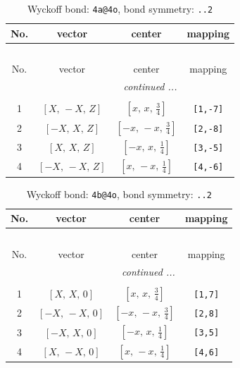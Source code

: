 \documentclass[fleqn,8pt]{jsarticle}
\begin{document}
\begin{longtable}{cccc}
\caption{Wyckoff bond: {\tt 4a@4o}, bond symmetry: {\tt ..2}}
 \\
 \hline \hline
No. & vector & center & mapping \\ \hline \endfirsthead

\multicolumn{3}{l}{\tablename\ \thetable{}} \\
 \hline \hline
No. & vector & center & mapping \\ \hline \endhead

 \hline \hline
\multicolumn{3}{r}{\footnotesize\it continued ...} \\ \endfoot

 \hline \hline
\multicolumn{3}{r}{} \\ \endlastfoot

1 & $\left[ X,\, - X,\, Z \right]$ & $\left[ x,\, x,\, \frac{3}{4} \right]$ & {\tt [1,-7]} \\ \hline
2 & $\left[ - X,\, X,\, Z \right]$ & $\left[ - x,\, - x,\, \frac{3}{4} \right]$ & {\tt [2,-8]} \\ \hline
3 & $\left[ X,\, X,\, Z \right]$ & $\left[ - x,\, x,\, \frac{1}{4} \right]$ & {\tt [3,-5]} \\ \hline
4 & $\left[ - X,\, - X,\, Z \right]$ & $\left[ x,\, - x,\, \frac{1}{4} \right]$ & {\tt [4,-6]} \\
\end{longtable}
\renewcommand{\arraystretch}{1.2}
\begin{longtable}{cccc}
\caption{Wyckoff bond: {\tt 4b@4o}, bond symmetry: {\tt ..2}}
 \\
 \hline \hline
No. & vector & center & mapping \\ \hline \endfirsthead

\multicolumn{3}{l}{\tablename\ \thetable{}} \\
 \hline \hline
No. & vector & center & mapping \\ \hline \endhead

 \hline \hline
\multicolumn{3}{r}{\footnotesize\it continued ...} \\ \endfoot

 \hline \hline
\multicolumn{3}{r}{} \\ \endlastfoot

1 & $\left[ X,\, X,\, 0 \right]$ & $\left[ x,\, x,\, \frac{3}{4} \right]$ & {\tt [1,7]} \\ \hline
2 & $\left[ - X,\, - X,\, 0 \right]$ & $\left[ - x,\, - x,\, \frac{3}{4} \right]$ & {\tt [2,8]} \\ \hline
3 & $\left[ - X,\, X,\, 0 \right]$ & $\left[ - x,\, x,\, \frac{1}{4} \right]$ & {\tt [3,5]} \\ \hline
4 & $\left[ X,\, - X,\, 0 \right]$ & $\left[ x,\, - x,\, \frac{1}{4} \right]$ & {\tt [4,6]} \\
\end{longtable}
\end{document}
